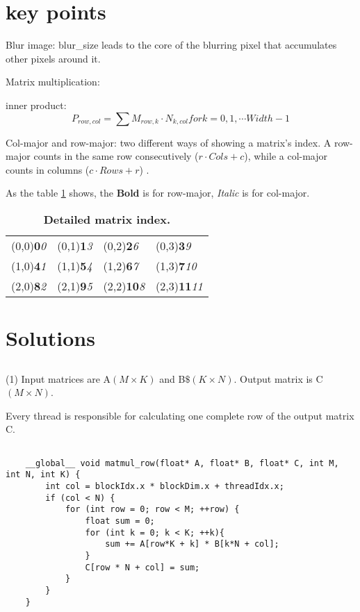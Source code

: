 \documentclass{article}
\begin{document}
\section*{key points}
Blur image:
blur\_size leads to the core of the blurring pixel that accumulates other pixels around it.

Matrix multiplication:

inner product:
\begin{equation}
    P_{row,col} = \sum M_{row,k}\cdot N_{k,col} for k = 0,1,\cdots Width-1
\end{equation}

Col-major and row-major:
two different ways of showing a matrix's index. A row-major counts in the same row consecutively (\( r \cdot Cols + c \)), while a col-major counts in columns (\( c \cdot Rows + r \)) .


As the table \ref{Matrix} shows, the \textbf{Bold} is for row-major, \textit{Italic} is for col-major.
\begin{table}[H]
    \centering
    \caption{\bf Detailed matrix index.}
    \label{Matrix}
    \begin{tabular}{llll}
    (0,0)\textbf{0}\textit{0} & (0,1)\textbf{1}\textit{3} & (0,2)\textbf{2}\textit{6} & (0,3)\textbf{3}\textit{9}  \\
    (1,0)\textbf{4}\textit{1} & (1,1)\textbf{5}\textit{4} & (1,2)\textbf{6}\textit{7} & (1,3)\textbf{7}\textit{10}  \\
    (2,0)\textbf{8}\textit{2} & (2,1)\textbf{9}\textit{5} & (2,2)\textbf{10}\textit{8} & (2,3)\textbf{11}\textit{11}
    \end{tabular}
\end{table}

\section{Solutions}
\subsection{}
(1)
Input matrices are A$(M \times K)$ and B$\$(K \times N)$.
Output matrix is C$(M \times N)$.

Every thread is responsible for calculating one complete row of the output matrix C.


\begin{lstlisting}[basicstyle=\small\ttfamily, breaklines=true]

    __global__ void matmul_row(float* A, float* B, float* C, int M, int N, int K) {
        int col = blockIdx.x * blockDim.x + threadIdx.x;
        if (col < N) {
            for (int row = 0; row < M; ++row) {
                float sum = 0;
                for (int k = 0; k < K; ++k){
                    sum += A[row*K + k] * B[k*N + col];
                }
                C[row * N + col] = sum;
            }
        }
    }
\end{lstlisting}
\end{document}
